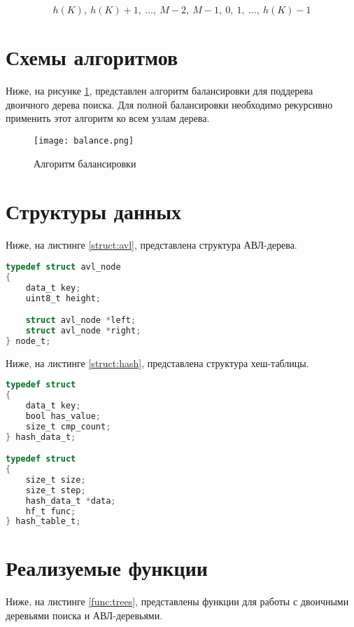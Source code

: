 \begin{equation}
    h(K),~ h(K)+1,~ \dots,~ M-2,~ M-1,~0,~1,~ \dots,~ h(K)-1
\end{equation}

\section{Схемы алгоритмов}

Ниже, на рисунке \ref{algo:balance}, представлен алгоритм балансировки для поддерева двоичного дерева поиска. Для полной балансировки необходимо рекурсивно применить этот алгоритм ко всем узлам дерева.

\begin{figure}
    \centering
    \texttt{[image: balance.png]}
    \caption{Алгоритм балансировки}
    \label{algo:balance}
\end{figure}

\clearpage

\section{Структуры данных}

Ниже, на листинге \ref{struct:avl}, представлена структура АВЛ-дерева.

\begin{lstlisting}[language=C,caption=Структура АВЛ-дерева,label=struct:avl]
typedef struct avl_node
{
    data_t key;
    uint8_t height;

    struct avl_node *left;
    struct avl_node *right;
} node_t;
\end{lstlisting}

Ниже, на листинге \ref{struct:hash}, представлена структура хеш-таблицы.

\begin{lstlisting}[language=C,caption=Структура хеш-таблицы,label=struct:hash]
typedef struct
{
    data_t key;
    bool has_value;
    size_t cmp_count;
} hash_data_t;

typedef struct
{
    size_t size;
    size_t step;
    hash_data_t *data;
    hf_t func;
} hash_table_t;
\end{lstlisting}

\clearpage

\section{Реализуемые функции}

Ниже, на листинге \ref{func:trees}, представлены функции для работы с двоичными деревьями поиска и АВЛ-деревьями.

